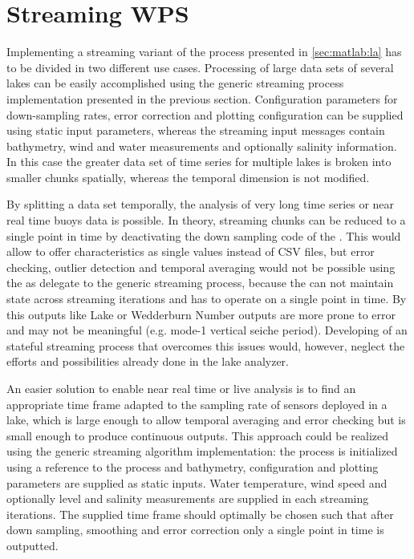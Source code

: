   \section{Streaming \la WPS}
    Implementing a streaming variant of the \la process presented in \cref{sec:matlab:la} has to be divided in two different use cases. Processing of large data sets of several lakes can be easily accomplished using the generic streaming process implementation presented in the previous section. Configuration parameters for down-sampling rates, error correction and plotting configuration can be supplied using static input parameters, whereas the streaming input messages contain bathymetry, wind and water measurements and optionally salinity information. In this case the greater data set of time series for multiple lakes is broken into smaller chunks spatially, whereas the temporal dimension is not modified.

    By splitting a data set temporally, the analysis of very long time series or near real time buoys data is possible. In theory, streaming chunks can be reduced to a single point in time by deactivating the down sampling code of the \la. This would allow to offer characteristics as single values instead of \ac{CSV} files, but error checking, outlier detection and temporal averaging would not be possible using the \la as delegate to the generic streaming process, because the \la can not maintain state across streaming iterations and has to operate on a single point in time. By this outputs like Lake or Wedderburn Number outputs are more prone to error and may not be meaningful (e.g. mode-1 vertical seiche period). Developing of an stateful streaming process that overcomes this issues would, however, neglect the efforts and possibilities already done in the lake analyzer.

    An easier solution to enable near real time or live analysis is to find an appropriate time frame adapted to the sampling rate of sensors deployed in a lake, which is large enough to allow temporal averaging and error checking but is small enough to produce continuous outputs. This approach could be realized using the generic streaming algorithm implementation: the process is initialized using a reference to the \la process and bathymetry, configuration and plotting parameters are supplied as static inputs. Water temperature, wind speed and optionally level and salinity measurements are supplied in each streaming iterations. The supplied time frame should optimally be chosen such that after down sampling, smoothing and error correction only a single point in time is outputted.

